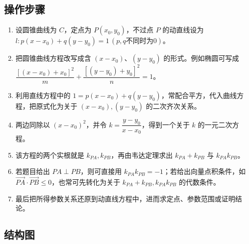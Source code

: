 \documentclass[UTF8,a4paper,11pt]{ctexart}
\begin{document}
\subsection*{操作步骤}

\begin{enumerate}

\item 设圆锥曲线为 $C$，定点为 $P(x_0,y_0)$，不过点 $P$ 的动直线设为 $l: p(x-x_0)+q(y-y_0)=1\,(p,q\text{不同时为}0)$。

\item 把圆锥曲线方程改写成含 $(x-x_0)$、$(y-y_0)$ 的形式。例如椭圆可写成 $\dfrac{[(x-x_0)+x_0]^2}{m}+\dfrac{[(y-y_0)+y_0]^2}{n}=1$。

\item 利用直线方程中的 $1=p(x-x_0)+q(y-y_0)$，常配合平方，代入曲线方程，把原式化为关于 $(x-x_0),(y-y_0)$ 的二次齐次关系。

\item 两边同除以 $(x-x_0)^2$，并令 $k=\dfrac{y-y_0}{x-x_0}$，得到一个关于 $k$ 的一元二次方程。

\item 该方程的两个实根就是 $k_{PA},k_{PB}$，再由韦达定理求出 $k_{PA}+k_{PB}$ 与 $k_{PA}k_{PB}$。

\item 若题目给出 $PA\perp PB$，则可直接用 $k_{PA}k_{PB}=-1$；若给出向量点积条件，如 $\overrightarrow{PA}\cdot\overrightarrow{PB}\le 0$，也常可先转化为关于 $k_{PA}+k_{PB},k_{PA}k_{PB}$ 的代数条件。

\item 最后把所得参数关系还原到动直线方程中，进而求定点、参数范围或证明结论。

\end{enumerate}

\subsection*{结构图}

\begin{center}


\end{center}
\end{document}
